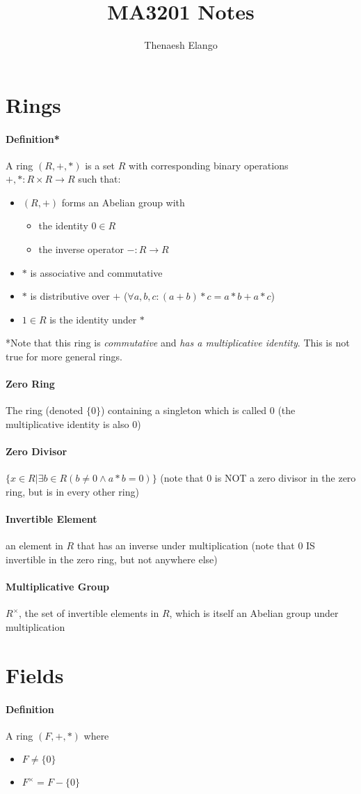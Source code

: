 \documentclass[]{article}
\title{MA3201 Notes}
\author{Thenaesh Elango}
\begin{document}
\maketitle

\section*{Rings}
	\paragraph{Definition*}
	A ring $(R,+,*)$ is a set $R$ with corresponding binary operations $+,* : R \times R \rightarrow R$ such that:
	\begin{itemize}
		\item $(R,+)$ forms an Abelian group with
		\begin{itemize}
			\item the identity $0 \in R$
			\item the inverse operator $- : R \rightarrow R$
		\end{itemize}
		\item $*$ is associative and commutative
		\item $*$ is distributive over $+$ ($\forall a,b,c: (a+b)*c = a*b + a*c$)
		\item $1 \in R$ is the identity under $*$
	\end{itemize}
	*Note that this ring is \emph{commutative} and \emph{has a multiplicative identity}. This is not true for more general rings.
	
	\paragraph{Zero Ring} The ring (denoted $\{0\}$) containing a singleton which is called $0$ (the multiplicative identity is also $0$)
	\paragraph{Zero Divisor} $\{x \in R | \exists b \in R (b \not= 0 \wedge a*b = 0)\}$ (note that $0$ is NOT a zero divisor in the zero ring, but is in every other ring)
	\paragraph{Invertible Element} an element in $R$ that has an inverse under multiplication (note that $0$ IS invertible in the zero ring, but not anywhere else)
	\paragraph{Multiplicative Group}  $R^\times$, the set of invertible elements in $R$, which is itself an Abelian group under multiplication

\section{Fields}
	\paragraph{Definition}
	A ring $(F,+,*)$ where
	\begin{itemize}
		\item $F \not= \{0\}$
		\item $F^\times = F - \{0\}$
	\end{itemize}
\end{document}
